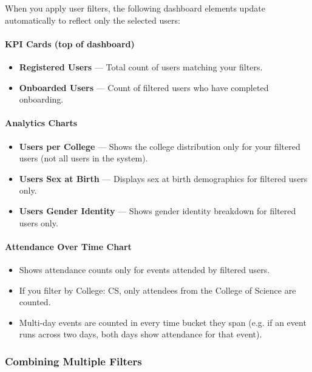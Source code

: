 \documentclass[12pt, a4paper]{article}
\begin{document}
When you apply user filters, the following dashboard elements update automatically to reflect only the selected users:

\paragraph{KPI Cards (top of dashboard)}
\begin{itemize}[leftmargin=1.5em]
  \item \textbf{Registered Users} — Total count of users matching your filters.
  \item \textbf{Onboarded Users} — Count of filtered users who have completed onboarding.
\end{itemize}

\paragraph{Analytics Charts}
\begin{itemize}[leftmargin=1.5em]
  \item \textbf{Users per College} — Shows the college distribution only for your filtered users (not all users in the system).
  \item \textbf{Users Sex at Birth} — Displays sex at birth demographics for filtered users only.
  \item \textbf{Users Gender Identity} — Shows gender identity breakdown for filtered users only.
\end{itemize}

\paragraph{Attendance Over Time Chart}
\begin{itemize}[leftmargin=1.5em]
  \item Shows attendance counts only for events attended by filtered users.
  \item If you filter by College: CS, only attendees from the College of Science are counted.
  \item Multi-day events are counted in every time bucket they span (e.g. if an event runs across two days, both days show attendance for that event).
\end{itemize}

\subsubsection{Combining Multiple Filters}
\end{document}

